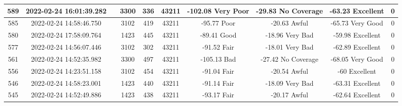 \begin{longtable*}{|c|c|c|c|c|c|c|c|c|c|}
589&2022-02-24 16:01:39.282&&3300&336&43211& -102.08   Very Poor   & -29.83    No Coverage & -63.23    Excellent   & 0\\\hline
{}585&2022-02-24 14:58:46.750&&3102&419&43211& -95.77    Poor        & -20.63    Awful       & -65.73    Very Good   & 0\\\hline
{}580&2022-02-24 17:58:09.764&&1423&445&43211& -89.41    Good        & -18.96    Very Bad    & -59.98    Excellent   & 0\\\hline
{}577&2022-02-24 14:56:07.446&&3102&302&43211& -91.52    Fair        & -18.01    Very Bad    & -62.89    Excellent   & 0\\\hline
{}561&2022-02-24 14:52:35.982&&3300&497&43211& -105.13   Bad         & -27.42    No Coverage & -68.05    Very Good   & 0\\\hline
{}556&2022-02-24 14:23:51.158&&3102&454&43211& -91.04    Fair        & -20.54    Awful       & -60       Excellent   & 0\\\hline
{}546&2022-02-24 14:58:23.001&&1423&440&43211& -91.14    Fair        & -18.09    Very Bad    & -63.31    Excellent   & 0\\\hline
{}545&2022-02-24 14:52:49.886&&1423&438&43211& -93.17    Fair        & -20.17    Awful       & -62.64    Excellent   & 0\\\hline

\end{longtable*}
